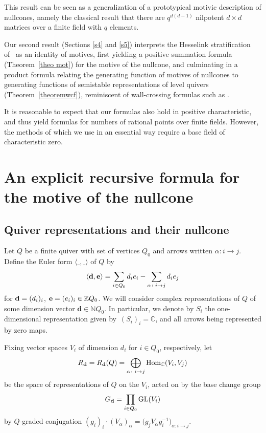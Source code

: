 \documentclass[10pt,a4paper]{amsart}
\numberwithin{equation}{section}
\theoremstyle{definition}
\begin{document}
This result can be seen as a generalization of a prototypical motivic description of nullcones, namely the classical result \cite{FH} that there are $q^{d(d-1)}$ nilpotent $d\times d$ matrices over a finite field with $q$ elements.

Our second result (Sections \ref{s4} and \ref{s5}) interprets the Hesselink stratification of~\cite{LB} as an identity of motives, first yielding a positive summation formula (Theorem~\ref{theo mot}) for the motive of the nullcone, and culminating in a product formula relating the generating function of motives of nullcones to generating functions of semistable representations of level quivers (Theorem~\ref{theoremwcf}), reminiscent of wall-crossing formulas such as \cite[Theorem~2.4]{MozIntro}.

It is reasonable to expect that our formulas also hold in positive characteristic, and thus yield formulas for numbers of rational points over finite fields. However, the methods of \cite{B,Hesse} which we use in an essential way require a base field of characteristic zero.

\section{An explicit recursive formula for the motive of the nullcone}\label{s2}

\subsection{Quiver representations and their nullcone}

Let $Q$ be a finite quiver with set of vertices $Q_0$ and arrows written $\alpha\colon i\rightarrow j$. Define the Euler form $\langle\_,\_\rangle$ of $Q$ by
\[\langle{\bf d},{\bf e}\rangle=\sum_{i\in Q_0}d_ie_i-\sum_{\alpha\colon i\rightarrow j}d_ie_j\]
for ${\bf d}=(d_i)_i$, ${\bf e}=(e_i)_i\in\mathbb{Z}Q_0$. We will consider complex representations of $Q$ of some dimension vector $\mathbf{d}\in\mathbb{N}Q_0$. In particular, we denote by $S_i$ the one-dimensional representation given by~$(S_i)_i=\mathbb{C}$, and all arrows being represented by zero maps.

Fixing vector spaces $V_i$ of dimension $d_i$ for $i\in Q_0$, respectively, let \[R_\mathbf{d}=R_\mathbf{d}(Q)=\bigoplus_{\alpha\colon i\rightarrow j}{\rm Hom}_\mathbb{C}(V_i,V_j)\] be the space of representations of $Q$ on the $V_i$, acted on by the base change group \[G_\mathbf{d}=\prod_{i\in Q_0}{\rm GL}(V_i)\] by $Q$-graded conjugation
$(g_i)_i\cdot(V_\alpha)_\alpha=\bigl(g_jV_\alpha g_i^{-1}\bigr)_{\alpha\colon i\rightarrow j}$.
\end{document}
